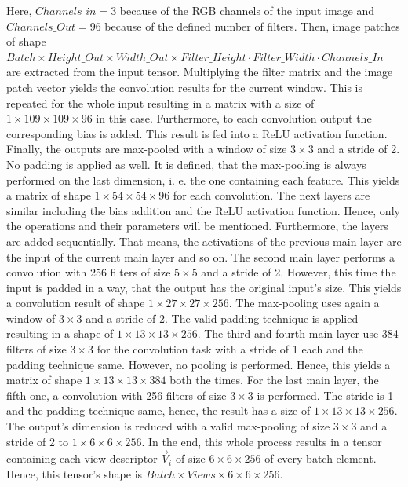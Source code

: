 Here, $Channels\_in = 3$ because of the RGB channels of the input image and $Channels\_Out = 96$ because of the defined number of filters.
Then, image patches of shape $Batch \times Height\_Out \times Width\_Out \times Filter\_Height \cdot Filter\_Width \cdot Channels\_In$ are extracted from the input tensor.
Multiplying the filter matrix and the image patch vector yields the convolution results for the current window.
This is repeated for the whole input resulting in a matrix with a size of $1 \times 109 \times 109 \times 96$ in this case.
Furthermore, to each convolution output the corresponding bias is added.
This result is fed into a ReLU activation function.
Finally, the outputs are max-pooled with a window of size $3 \times 3$ and a stride of 2.
No padding is applied as well.
It is defined, that the max-pooling is always performed on the last dimension, i. e. the one containing each feature.
This yields a matrix of shape $1 \times 54 \times 54 \times 96$ for each convolution.
The next layers are similar including the bias addition and the ReLU activation function.
Hence, only the operations and their parameters will be mentioned.
Furthermore, the layers are added sequentially.
That means, the activations of the previous main layer are the input of the current main layer and so on.
The second main layer performs a convolution with 256 filters of size $5 \times 5$ and a stride of 2.
However, this time the input is padded in a way, that the output has the original input's size.
This yields a convolution result of shape $1 \times 27 \times 27 \times 256$.
The max-pooling uses again a window of $3 \times 3$ and a stride of 2.
The valid padding technique is applied resulting in a shape of $1 \times 13 \times 13 \times 256$.
The third and fourth main layer use 384 filters of size $3 \times 3$ for the convolution task with a stride of 1 each and the padding technique same.
However, no pooling is performed.
Hence, this yields a matrix of shape $1 \times 13 \times 13 \times 384$ both the times.
For the last main layer, the fifth one, a convolution with 256 filters of size $3 \times 3$ is performed.
The stride is 1 and the padding technique same, hence, the result has a size of $1 \times 13 \times 13 \times 256$.
The output's dimension is reduced with a valid max-pooling of size $3 \times 3$ and a stride of 2 to $1 \times 6 \times 6 \times 256$.
In the end, this whole process results in a tensor containing each view descriptor $\vec{V}_i$ of size $6 \times 6 \times 256$ of every batch element.
Hence, this tensor's shape is $Batch \times Views \times 6 \times 6 \times 256$.